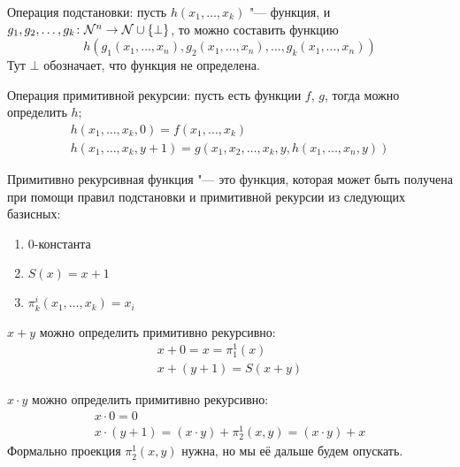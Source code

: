 \begin{Def}
	Операция подстановки:
	пусть $h(x_1, \dots, x_k)$ "--- функция, и $g_1, g_2, \dots, g_k \colon \mathcal{N}^n \to \mathcal{N} \cup \{\bot\}$, то можно составить
	функцию
	\[
	h(g_1(x_1, \dots, x_n), g_2(x_1, \dots, x_n), \dots, g_k(x_1, \dots, x_n))
	\]
	Тут $\bot$ обозначает, что функция не определена.
\end{Def}
\begin{Def}
	Операция примитивной рекурсии:
	пусть есть функции $f$, $g$, тогда можно определить $h$;
	\begin{gather*}
	h(x_1, \dots, x_k, 0) = f(x_1, \dots, x_k) \\
	h(x_1, \dots, x_k, y+1) = g(x_1, x_2, \dots, x_k, y, h(x_1, \dots, x_n, y))
	\end{gather*}
\end{Def}
\begin{Def}
	Примитивно рекурсивная функция "--- это функция, которая может быть получена при помощи
	правил подстановки и примитивной рекурсии из следующих базисных:
	\begin{enumerate}
	\item $0$-константа
	\item $S(x)=x+1$
	\item $\pi_k^i(x_1, \dots, x_k)=x_i$
	\end{enumerate}
\end{Def}

\begin{exmp}
	$x+y$ можно определить примитивно рекурсивно:
	\begin{gather*}
	x+0=x=\pi_1^1(x) \\
	x+(y+1)=S(x+y)
	\end{gather*}
\end{exmp}
\begin{exmp}
	$x \cdot y$ можно определить примитивно рекурсивно:
	\begin{gather*}
	x\cdot 0=0 \\
	x\cdot(y+1)=(x\cdot y) + \pi_2^1(x, y) = (x\cdot y) + x
	\end{gather*}
	Формально проекция $\pi_2^1(x, y)$ нужна, но мы её дальше будем опускать.
\end{exmp}
